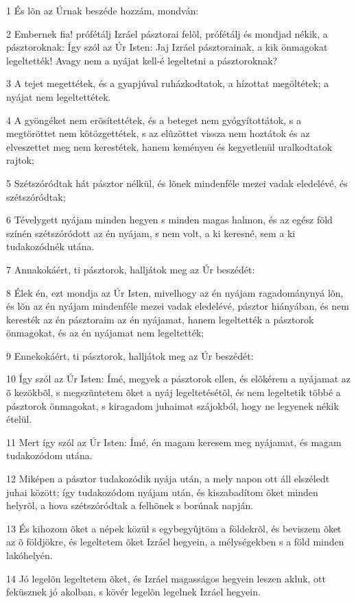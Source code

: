 \par 1 És lõn az Úrnak beszéde hozzám, mondván:
\par 2 Embernek fia! prófétálj Izráel pásztorai felõl, prófétálj és mondjad nékik, a pásztoroknak: Így szól az Úr Isten: Jaj Izráel pásztorainak, a kik önmagokat legeltették! Avagy nem a nyájat kell-é legeltetni a pásztoroknak?
\par 3 A tejet megettétek, és a gyapjúval ruházkodtatok, a hízottat megöltétek; a nyájat nem legeltettétek.
\par 4 A gyöngéket nem erõsítettétek, és a beteget nem gyógyítottátok, s a megtöröttet nem kötözgettétek, s az elûzöttet vissza nem hoztátok és az elveszettet meg nem kerestétek, hanem keményen és kegyetlenül uralkodtatok rajtok;
\par 5 Szétszóródtak hát pásztor nélkül, és lõnek mindenféle mezei vadak eledelévé, és szétszóródtak;
\par 6 Tévelygett nyájam minden hegyen s minden magas halmon, és az egész föld színén szétszóródott az én nyájam, s nem volt, a ki keresné, sem a ki tudakozódnék utána.
\par 7 Annakokáért, ti pásztorok, halljátok meg az Úr beszédét:
\par 8 Élek én, ezt mondja az Úr Isten, mivelhogy az én nyájam ragadománynyá lõn, és lõn az én nyájam mindenféle mezei vadak eledelévé, pásztor hiányában, és nem keresték az én pásztoraim az én nyájamat, hanem legeltették a pásztorok önmagokat, és az én nyájamat nem legeltették;
\par 9 Ennekokáért, ti pásztorok, halljátok meg az Úr beszédét:
\par 10 Így szól az Úr Isten: Ímé, megyek a pásztorok ellen, és elõkérem a nyájamat az õ kezökbõl, s megszüntetem õket a nyáj legeltetésétõl, és nem legeltetik többé a pásztorok önmagokat, s kiragadom juhaimat szájokból, hogy ne legyenek nékik ételül.
\par 11 Mert így szól az Úr Isten: Ímé, én magam keresem meg nyájamat, és magam tudakozódom utána.
\par 12 Miképen a pásztor tudakozódik nyája után, a mely napon ott áll elszéledt juhai között; így tudakozódom nyájam után, és kiszabadítom õket minden helyrõl, a hova szétszóródtak a felhõnek s borúnak napján.
\par 13 És kihozom õket a népek közül s egybegyûjtöm a földekrõl, és beviszem õket az õ földjökre, és legeltetem õket Izráel hegyein, a mélységekben s a föld minden lakóhelyén.
\par 14 Jó legelõn legeltetem õket, és Izráel magasságos hegyein leszen akluk, ott feküsznek jó akolban, s kövér legelõn legelnek Izráel hegyein.
